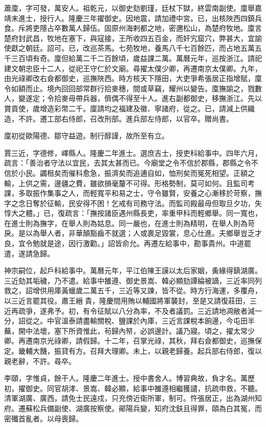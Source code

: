 \begin{pinyinscope}
蕭廩，字可發，萬安人。祖乾元，以御史劾劉瑾，廷杖下獄，終雲南副使。廩舉嘉靖末進士，授行人。隆慶三年擢御史。因地震，請加禮中宮。已，出核陜西四鎮兵食。斥將吏隱占卒數萬人歸伍。固原州海剌都之地，密邇松山，為楚府牧地。廩言楚府封武昌，牧地在塞下，與寇接，王所收四五百金，而奸宄窟穴，弊甚大，宜諭使獻之朝廷。詔可。已，改巡茶馬。七苑牧地，養馬八千七百餘匹，而占地五萬五千三百頃有奇。廩但給萬二千二百餘頃，歲益課二萬。萬曆元年，巡按浙江。請祀建文朝忠臣十二人，從祀王守仁於文廟。尋擢太僕少卿，再遷南京太僕卿。九年，由光祿卿改右僉都御史，巡撫陜西。時方核天下隱田，大吏爭希張居正指增賦，廩令如額而止。境內回回部常群行拾麥穗，間或草竊，耀州以變告。廩撫諭之，戮數人，變遂定；令拾麥毋帶兵器，儕偶不得至十人。進右副都御史，移撫浙江。先以賞貢使，歲增造彩幣二千。廩請均之福建及徽、寧諸府，從之。已，請減上供織造，不許。遷工部右侍郎，召改刑部。進兵部左侍郎，以官卒。贈尚書。

廩初從歐陽德、鄒守益遊。制行醇謹，故所至有立。

賈三近，字德修，嶧縣人。隆慶二年進士。選庶吉士，授吏科給事中。四年六月，疏言：「善治者守法以宜民，去其太甚而已。今廟堂之令不信於郡縣，郡縣之令不信於小民。蠲租矣而催科愈急，振濟矣而追逋自如，恤刑矣而冤死相望。正額之輸，上供之需，邊疆之費，雖欲損毫釐不可得。形格勢制，莫可如何。且監司考課，多取振作集事之人，而輕寬平和易之士，守令雖賢，安養之心漸移於苛察，撫字之念日奪於征輸，民安得不困！乞戒有司務守法。而監司殿最毋但取旦夕功，失惇大之體。」已，復疏言：「撫按諸臣遇州縣長吏，率重甲科而輕鄉舉。同一寬也，在進士則為撫字，在舉人則為姑息。同一嚴也，在進士則為精明，在舉人則為苛戾。是以為舉人者，非華顛豁齒不就選；人或裹足毀裳，息心仕進。夫鄉舉豈乏才良，宜令勉就是途，因行激勸。」詔皆俞允。再遷左給事中，勘事貴州。中道罷遣，遂請急歸。

神宗嗣位，起戶科給事中。萬曆元年，平江伯陳王謨以太后家姻，夤緣得鎮湖廣。三近劾其垢穢，乃不遣。給事中雒遵、御史景嵩、韓必顯劾譚綸被謫，三近率同列救之，詔增供用庫黃蠟歲二萬五千，三近等又諫，皆不從。時方行海運，多覆舟，以三近言罷其役。肅王縉貴，隆慶間用賄以輔國將軍襲封，至是又請復莊田，三近再疏爭，遂弗予。初，有令征賦以八分為率，不及者議罰。三近請地凋敝者減一分，詔從之。中官溫泰請盡輸關稅、鹽課於內庫，三近言課稅本餉邊，今屯田半蕪，開中法壞，塞下所資惟此，茍歸內帑，必誤邊計。議乃寢。頃之，擢太常少卿。再遷南京光祿卿，請假歸。十二年，召掌光祿，其秋，拜右僉都御史，巡撫保定。畿輔大饑，振貸有方。召拜大理卿。未上，以親老歸養。起兵部右侍郎，復以親老辭，不許。尋卒。

李頤，字惟貞，餘干人。隆慶二年進士。授中書舍人。博習典故，負才名。萬歷初，擢御史。同官胡涍、景嵩、韓必顯，給事中雒遵相繼獲譴，抗疏申救，不聽。清軍湖廣、廣西，請免士民遠戍，只充傍近衛所軍，制可。忤張居正，出為湖州知府。遷蘇松兵備副使、湖廣按察使。鄖陽兵變，知府沈鈇且得罪，頤為白其冤，而密殲首亂者。以母喪歸。


\end{pinyinscope}
